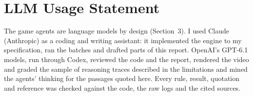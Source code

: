 \section*{LLM Usage Statement}
The game agents are language models by design (Section~3). I used Claude
(Anthropic) as a coding and writing assistant: it implemented the engine to my
specification, ran the batches and drafted parts of this report. OpenAI's GPT-6.1
models, run through Codex, reviewed the code and the report, rendered the video and
graded the sample of reasoning traces described in the limitations and mined the agents' thinking for the passages quoted here. Every rule, result,
quotation and reference was checked against the code, the raw logs and the cited
sources.

